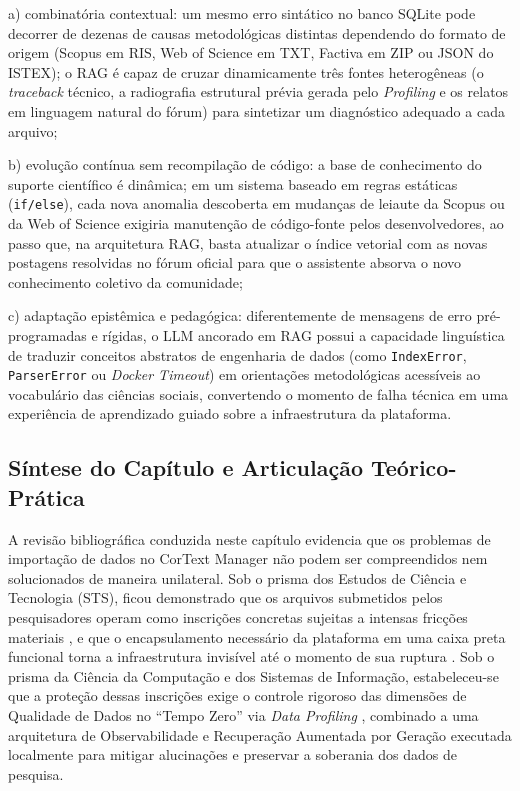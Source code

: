 \documentclass[
	oneside,
	a4paper,
	12pt,
	chapter=TITLE,
	section=TITLE,
	english,
	brazilian
]{abntex2}
\begin{document}
\par\indent a) combinatória contextual: um mesmo erro sintático no banco SQLite pode decorrer de dezenas de causas metodológicas distintas dependendo do formato de origem (Scopus em RIS, Web of Science em TXT, Factiva em ZIP ou JSON do ISTEX); o RAG é capaz de cruzar dinamicamente três fontes heterogêneas (o \textit{traceback} técnico, a radiografia estrutural prévia gerada pelo \textit{Profiling} e os relatos em linguagem natural do fórum) para sintetizar um diagnóstico adequado a cada arquivo;
\par\indent b) evolução contínua sem recompilação de código: a base de conhecimento do suporte científico é dinâmica; em um sistema baseado em regras estáticas (\texttt{if/\allowbreak else}), cada nova anomalia descoberta em mudanças de leiaute da Scopus ou da Web of Science exigiria manutenção de código-fonte pelos desenvolvedores, ao passo que, na arquitetura RAG, basta atualizar o índice vetorial com as novas postagens resolvidas no fórum oficial para que o assistente absorva o novo conhecimento coletivo da comunidade;
\par\indent c) adaptação epistêmica e pedagógica: diferentemente de mensagens de erro pré-programadas e rígidas, o LLM ancorado em RAG possui a capacidade linguística de traduzir conceitos abstratos de engenharia de dados (como \texttt{IndexError}, \texttt{ParserError} ou \textit{Docker Timeout}) em orientações metodológicas acessíveis ao vocabulário das ciências sociais, convertendo o momento de falha técnica em uma experiência de aprendizado guiado sobre a infraestrutura da plataforma.

\FloatBarrier
\subsection{Síntese do Capítulo e Articulação Teórico-Prática}\label{sec:sintese_do_capitulo_e_articulacao_teoric}


A revisão bibliográfica conduzida neste capítulo evidencia que os problemas de importação de dados no CorText Manager não podem ser compreendidos nem solucionados de maneira unilateral. Sob o prisma dos Estudos de Ciência e Tecnologia (STS), ficou demonstrado que os arquivos submetidos pelos pesquisadores operam como inscrições concretas \cite{Abdo2021} sujeitas a intensas fricções materiais \cite{Edwards2010,Kitchin2014}, e que o encapsulamento necessário da plataforma em uma caixa preta funcional \cite{Latour1987,Parnas1972} torna a infraestrutura invisível até o momento de sua ruptura \cite{Bowker1999}. Sob o prisma da Ciência da Computação e dos Sistemas de Informação, estabeleceu-se que a proteção dessas inscrições exige o controle rigoroso das dimensões de Qualidade de Dados no ``Tempo Zero'' via \textit{Data Profiling} \cite{Wang1996,Naumann2014}, combinado a uma arquitetura de Observabilidade \cite{Majors2022} e Recuperação Aumentada por Geração \cite{Lewis2020,Gao2023} executada localmente para mitigar alucinações \cite{Bender2021,Ji2023} e preservar a soberania dos dados de pesquisa.
\end{document}
